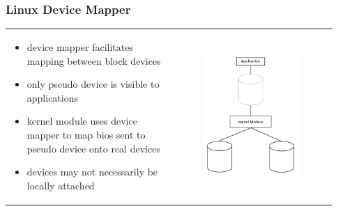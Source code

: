 \documentclass{beamer}
\begin{document}
\begin{frame}
	\frametitle{Linux Device Mapper}
	\begin{tabular}{m{0.465\linewidth}m{0.465\linewidth}}
		\begin{itemize}
			\item device mapper facilitates mapping between block devices
			\item only pseudo device is visible to applications
			\item kernel module uses device mapper to map bios sent to pseudo
				device onto real devices
			\item devices may not necessarily be locally attached
		\end{itemize} &
		\begin{figure}
			\centering \includegraphics[scale=.23]{DM.png}
			\label{fig:dm}
		\end{figure} \\
	\end{tabular}
\end{frame}
\end{document}
